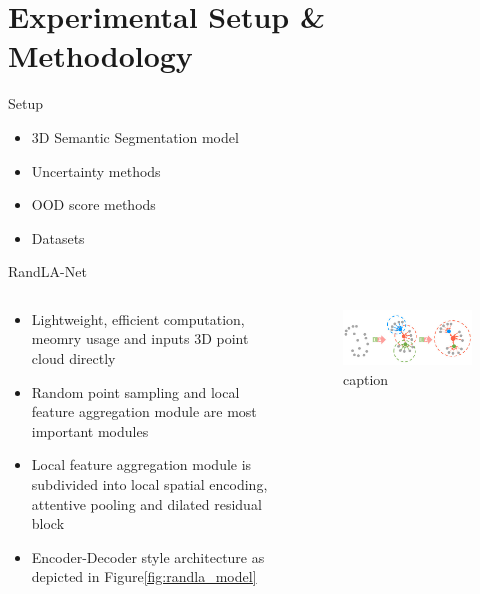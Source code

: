 \documentclass[aspectratio=169]{beamer}
\begin{document}
\section{Experimental Setup \& Methodology}
\begin{frame}[noframenumbering]{Setup}
    \begin{itemize}

        \item 3D Semantic Segmentation model
        \item Uncertainty methods
        \item OOD score methods
        \item Datasets
    \end{itemize}
\end{frame}
\begin{frame}{RandLA-Net}
    \begin{columns}
        \begin{column}{0.6\textwidth}
            \begin{itemize}
                \item Lightweight, efficient computation, meomry usage and inputs 3D point cloud directly
                \item Random point sampling and local feature aggregation module are most important modules
                \item Local feature aggregation module is subdivided into local spatial encoding, attentive pooling and dilated residual block
                \item Encoder-Decoder style architecture as depicted in Figure\ref{fig:randla_model}
            \end{itemize}
        \end{column}
        \begin{column}{0.4\textwidth}
            \begin{figure}
                \centering
                \includegraphics[scale=0.35]{images/randlanet_dires_effect.jpg}
                \caption{caption}
                \label{fig:dires_effect}
            \end{figure}
        \end{column}
    \end{columns}
    
\end{frame}
\end{document}
